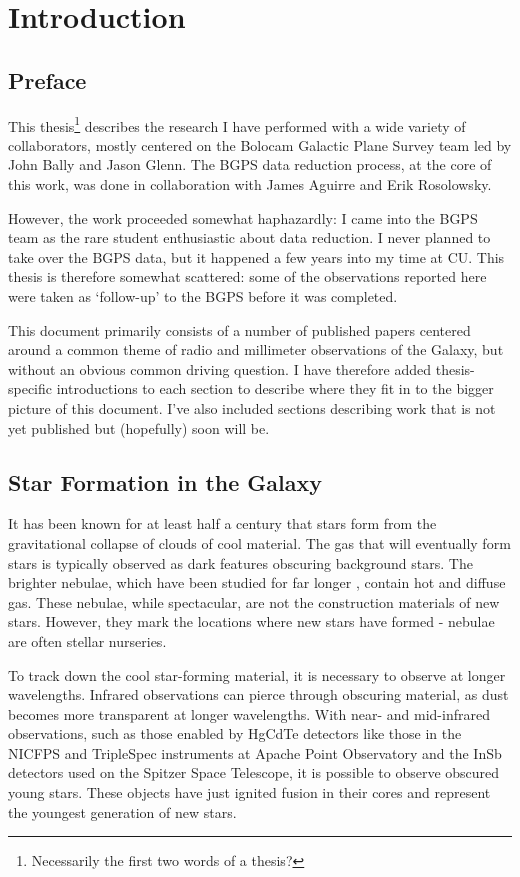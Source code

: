 
\chapter{Introduction}
\section{Preface}
This thesis\footnote{Necessarily the first two words of a thesis?} describes
the research I have performed with a wide variety of collaborators, mostly
centered on the Bolocam Galactic Plane Survey team led by John Bally and Jason
Glenn.  The BGPS data reduction process, at the core of this work, was done in 
collaboration with James Aguirre and Erik Rosolowsky.

However, the work proceeded somewhat haphazardly: I came into the BGPS team as
the rare student enthusiastic about data reduction.  I never planned to take
over the BGPS data, but it happened a few years into my time at CU.  This
thesis is therefore somewhat scattered: some of the observations reported here
were taken as `follow-up' to the BGPS before it was completed.

This document primarily consists of a number of published papers centered
around a common theme of radio and millimeter observations of the Galaxy, but
without an obvious common driving question.  I have therefore added
thesis-specific introductions to each section to describe where they fit in to
the bigger picture of this document.  I've also included sections describing
work that is not yet published but (hopefully) soon will be.

\section{Star Formation in the Galaxy}
It has been known for at least half a century that stars form from the
gravitational collapse of clouds of cool material.  The gas that will
eventually form stars is typically observed as dark features obscuring
background stars.  The brighter nebulae, which have been studied for far longer
\citep{Messier1764}, contain hot and diffuse gas.  These nebulae, while
spectacular, are not the construction materials of new stars.  However,
they mark the locations where new stars have formed - nebulae are often
stellar nurseries.

To track down the cool star-forming material, it is necessary to observe at
longer wavelengths.  Infrared observations can pierce through obscuring
material, as dust becomes more transparent at longer wavelengths.  With near-
and mid-infrared observations, such as those enabled by HgCdTe detectors like
those in the NICFPS and TripleSpec instruments at Apache Point Observatory and
the InSb detectors used on the Spitzer Space Telescope, it is possible to
observe obscured young stars.  These objects have just ignited fusion in their
cores and represent the youngest generation of new stars.

